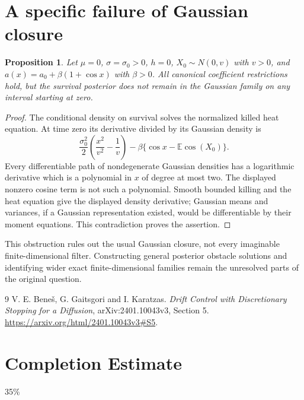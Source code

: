 \documentclass[11pt]{article}
\newtheorem{proposition}[theorem]{Proposition}
\theoremstyle{definition}
\begin{document}
\section*{A specific failure of Gaussian closure}
\begin{proposition}
Let $\mu=0$, $\sigma=\sigma_0>0$, $h=0$, $X_0\sim N(0,v)$ with $v>0$,
and $a(x)=a_0+\beta(1+\cos x)$ with $\beta>0$.
All canonical coefficient restrictions hold, but the survival posterior
does not remain in the Gaussian family on any interval starting at zero.
\end{proposition}
\begin{proof}
The conditional density on survival solves the normalized killed heat
equation. At time zero its derivative divided by its Gaussian density is
\[
 \frac{\sigma_0^2}{2}\left(\frac{x^2}{v^2}-\frac1v\right)
                     -\beta\{\cos x-\mathbb E\cos(X_0)\}.
\]
Every differentiable path of nondegenerate Gaussian densities has a
logarithmic derivative which is a polynomial in $x$ of degree at most two.
The displayed nonzero cosine term is not such a polynomial. Smooth bounded
killing and the heat equation give the displayed density derivative;
Gaussian means and variances, if a Gaussian representation existed, would
be differentiable by their moment equations. This contradiction proves
the assertion.
\end{proof}
This obstruction rules out the usual Gaussian closure, not every imaginable
finite-dimensional filter. Constructing general posterior obstacle
solutions and identifying wider exact finite-dimensional families remain
the unresolved parts of the original question.

\begin{thebibliography}{9}
 V. E. Bene\v{s}, G. Gaitsgori and I. Karatzas.
\emph{Drift Control with Discretionary Stopping for a Diffusion}, arXiv:2401.10043v3, Section 5.
\url{https://arxiv.org/html/2401.10043v3#S5}.
\end{thebibliography}
\section{Completion Estimate}
35\%
\end{document}
